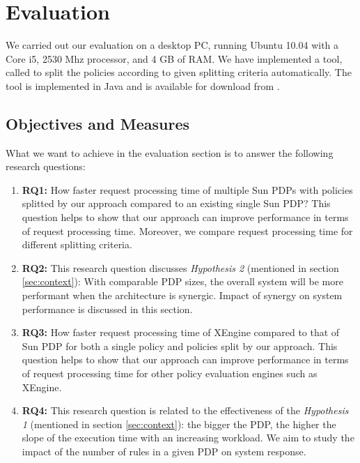 
\section{Evaluation} \label{sec:experiment}
We carried out our evaluation on a desktop PC, running Ubuntu 10.04 with a Core i5, 2530 Mhz processor, and 4 GB of RAM. 
We have implemented a tool, called  to split the policies according to given splitting criteria automatically.
The tool is implemented in Java and is available for download from \cite{splitter}.

\subsection{Objectives and Measures}
What we want to achieve in the evaluation section is to answer the following research questions:
\begin{enumerate}
\item \textbf{RQ1:} How faster request processing time of multiple Sun PDPs with policies splitted by our approach compared
to an existing single Sun PDP? This question helps to show that our approach can improve performance in terms of request processing time. 
Moreover, we compare request processing time for different splitting criteria.
\item \textbf{RQ2:} This research question discusses \textit{Hypothesis 2} (mentioned in section \ref{sec:context}): 
With comparable PDP sizes, the overall system will be more performant when the architecture is synergic. 
Impact of synergy on system performance is discussed in this section.
\item \textbf{RQ3:} How faster request processing time of XEngine compared
to that of Sun PDP for both a single policy and policies split by our approach.
This question helps to show that our approach can improve performance in terms of request processing time for other policy evaluation 
engines such as XEngine.
\item \textbf{RQ4:} This research question is related to the effectiveness of the \textit{Hypothesis 1} 
(mentioned in section \ref{sec:context}): the bigger the PDP, the higher the slope of the execution 
time with an increasing workload. We aim to study the impact of the number of rules in a given PDP on system response.
\end{enumerate}

